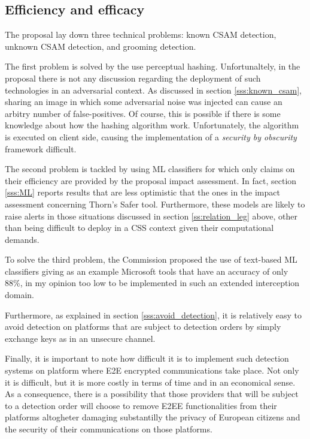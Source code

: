 \subsection{Efficiency and efficacy}

The proposal lay down three technical problems: known CSAM detection, unknown CSAM detection, and grooming detection. 

The first problem is solved by the use perceptual hashing. Unfortunaltely, in the proposal there is not any discussion regarding the deployment of such technologies in an adversarial context. As discussed in section \ref{sss:known_csam}, sharing an image in which some adversarial noise was injected can cause an arbitry number of false-positives. Of course, this is possible if there is some knowledge about how the hashing algorithm work. Unfortunately, the algorithm is executed on client side, causing the implementation of a \textit{security by obscurity} framework difficult.

The second problem is tackled by using ML classifiers for which only claims on their efficiency are provided by the proposal impact assessment. In fact, section \ref{sss:ML} reports results that are less optimistic that the ones in the impact assessment concerning Thorn's Safer tool. Furthermore, these models are likely to raise alerts in those situations discussed in section \ref{ss:relation_leg} above, other than being difficult to deploy in a CSS context given their computational demands. 

To solve the third problem, the Commission proposed the use of text-based ML classifiers giving as an example Microsoft tools that have an accuracy of only 88\%, in my opinion too low to be implemented in such an extended interception domain.

Furthermore, as explained in section \ref{sss:avoid_detection}, it is relatively easy to avoid detection on platforms that are subject to detection orders by simply exchange keys as in an unsecure channel.

Finally, it is important to note how difficult it is to implement such detection systems on platform where E2E encrypted communications take place. Not only it is difficult, but it is more costly in terms of time and in an economical sense. As a consequence, there is a possibility that those providers that will be subject to a detection order will choose to remove E2EE functionalities from their platforms altogheter damaging substantilly the privacy of European citizens and the security of their communications on those platforms.
